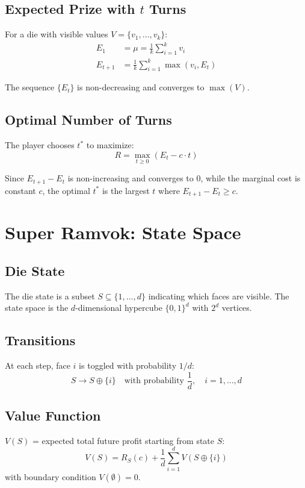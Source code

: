 \documentclass[11pt]{article}
\begin{document}
\subsection{Expected Prize with $t$ Turns}

For a die with visible values $V = \{v_1, \ldots, v_k\}$:
\begin{align*}
E_1 &= \mu = \frac{1}{k}\sum_{i=1}^k v_i \\
E_{t+1} &= \frac{1}{k}\sum_{i=1}^k \max(v_i, E_t)
\end{align*}

The sequence $\{E_t\}$ is non-decreasing and converges to $\max(V)$.

\subsection{Optimal Number of Turns}

The player chooses $t^*$ to maximize:
\[
R = \max_{t \geq 0} (E_t - c \cdot t)
\]

Since $E_{t+1} - E_t$ is non-increasing and converges to 0, while the marginal cost is constant $c$, the optimal $t^*$ is the largest $t$ where $E_{t+1} - E_t \geq c$.

\section{Super Ramvok: State Space}

\subsection{Die State}

The die state is a subset $S \subseteq \{1, \ldots, d\}$ indicating which faces are visible. The state space is the $d$-dimensional hypercube $\{0,1\}^d$ with $2^d$ vertices.

\subsection{Transitions}

At each step, face $i$ is toggled with probability $1/d$:
\[
S \to S \oplus \{i\} \quad \text{with probability } \frac{1}{d}, \quad i = 1, \ldots, d
\]

\subsection{Value Function}

$V(S)$ = expected total future profit starting from state $S$:
\[
V(S) = R_S(c) + \frac{1}{d}\sum_{i=1}^{d} V(S \oplus \{i\})
\]
with boundary condition $V(\emptyset) = 0$.
\end{document}
